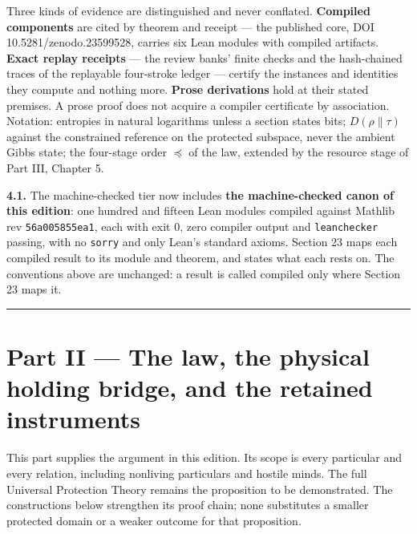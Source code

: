 \documentclass[
]{article}
\newcounter{none} %
\begin{document}
Three kinds of evidence are distinguished and never conflated.
\textbf{Compiled components} are cited by theorem and receipt --- the
published core, DOI
1\allowbreak{}0\allowbreak{}.\allowbreak{}5\allowbreak{}2\allowbreak{}8\allowbreak{}1\allowbreak{}/\allowbreak{}z\allowbreak{}e\allowbreak{}n\allowbreak{}o\allowbreak{}d\allowbreak{}o\allowbreak{}.\allowbreak{}2\allowbreak{}3\allowbreak{}5\allowbreak{}9\allowbreak{}9\allowbreak{}5\allowbreak{}2\allowbreak{}8\allowbreak{},
carries six Lean modules with compiled artifacts. \textbf{Exact replay
receipts} --- the review banks' finite checks and the hash-chained
traces of the replayable four-stroke ledger --- certify the instances
and identities they compute and nothing more. \textbf{Prose derivations}
hold at their stated premises. A prose proof does not acquire a compiler
certificate by association. Notation: entropies in natural logarithms
unless a section states bits; \(D(\rho\|\tau)\) against the constrained
reference on the protected subspace, never the ambient Gibbs state; the
four-stage order \(\preceq\) of the law, extended by the resource stage
of Part III, Chapter 5.

\textbf{4.1.} The machine-checked tier now includes \textbf{the
machine-checked canon of this edition}: one hundred and fifteen Lean
modules compiled against Mathlib rev \texttt{56a005855ea1}, each with
exit 0, zero compiler output and \texttt{leanchecker} passing, with no
\texttt{sorry} and only Lean's standard axioms. Section 23 maps each
compiled result to its module and theorem, and states what each rests
on. The conventions above are unchanged: a result is called compiled
only where Section 23 maps it.

\begin{center}\rule{0.5\linewidth}{0.5pt}\end{center}

\section{Part II --- The law, the physical holding bridge, and the
retained
instruments}\label{part-ii-the-law-the-physical-holding-bridge-and-the-retained-instruments}

This part supplies the argument in this edition. Its scope is every
particular and every relation, including nonliving particulars and
hostile minds. The full Universal Protection Theory remains the
proposition to be demonstrated. The constructions below strengthen its
proof chain; none substitutes a smaller protected domain or a weaker
outcome for that proposition.
\end{document}

